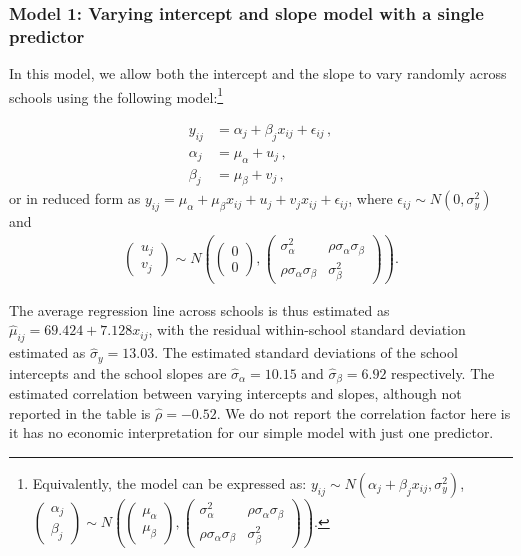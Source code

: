 \subsubsection*{Model 1: Varying intercept and slope model with a single predictor}
In this model, we allow both the intercept and the slope to vary randomly across schools using the following model:\footnote{Equivalently, the model can be expressed as: $y_{ij}\sim N(\alpha_{j}+\beta_{j}x_{ij} , \sigma_y ^2 )$, $\left( \begin{matrix} \alpha _{ j } \\ \beta _{ j } \end{matrix} \right) \sim N\left( \left( \begin{matrix} { \mu  }_{ \alpha  } \\ { \mu  }_{ \beta  } \end{matrix} \right) , \left( \begin{matrix} { \sigma  }_{ \alpha  }^{ 2 } & \rho { \sigma  }_{ \alpha  }{ \sigma  }_{ \beta  } \\ \rho { \sigma  }_{ \alpha  }{ \sigma  }_{ \beta  } & { \sigma  }_{ \beta  }^{ 2 } \end{matrix} \right)  \right).$}

\begin{align}
	y_{ij} &= \alpha_j + \beta_j x_{ij} +\epsilon_{ij} \,, \\
	\alpha_j &= \mu_\alpha + u_j \,, \\
	\beta_j &= \mu_\beta + v_j \,,
\end{align}
or in reduced form as $y_{ij} = \mu_\alpha + \mu_\beta x_{ij} + u_j + v_j x_{ij} + \epsilon_{ij}$, where $\epsilon_{ij} \sim N(0, \sigma_{y}^{2})$ and
\begin{align}
	\left( \begin{matrix} u_j \\ v_j \end{matrix} \right) \sim N\left( \left( \begin{matrix} 0 \\ 0 \end{matrix} \right) ,\left( \begin{matrix} { \sigma  }_{ \alpha  }^{ 2 } & \rho { \sigma  }_{ \alpha  }{ \sigma  }_{ \beta  } \\ \rho { \sigma  }_{ \alpha  }{ \sigma  }_{ \beta  } & { \sigma  }_{ \beta  }^{ 2 } \end{matrix} \right)  \right).
\end{align}


The average regression line across schools is thus estimated as $\hat{\mu}_{ij} = 69.424 + 7.128 x_{ij}$, with the residual within-school standard deviation estimated as $\hat{\sigma}_{y}=13.03$. The estimated standard deviations of the school intercepts and the school slopes are $\hat{\sigma}_{\alpha}= 10.15$ and $\hat{\sigma}_{\beta}=6.92$ respectively. The estimated correlation between varying intercepts and slopes, although not reported in the table is $\hat{\rho} = -0.52$. We do not report the correlation factor here is it has no economic interpretation for our simple model with just one predictor.

